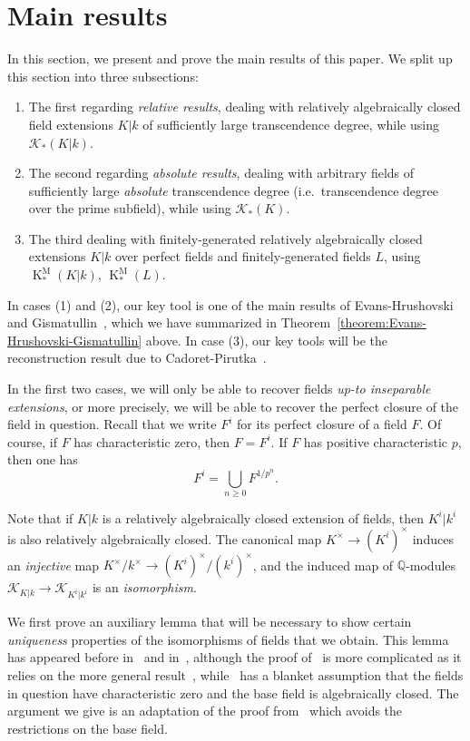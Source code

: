 \documentclass[12pt]{amsart}
\newcommand{\KM}{\operatorname{K}^\mathrm{M}}
\newcommand{\Qbb}{\mathbb{Q}}
\newcommand{\Kcal}{\mathcal{K}}
\theoremstyle{definition}
\begin{document}
\section{Main results}

In this section, we present and prove the main results of this paper.
We split up this section into three subsections:
\begin{enumerate}
  \item The first regarding \emph{relative results}, dealing with relatively algebraically closed field extensions $K|k$ of sufficiently large transcendence degree, while using $\Kcal_{*}(K|k)$.
  \item The second regarding \emph{absolute results}, dealing with arbitrary fields of sufficiently large \emph{absolute} transcendence degree (i.e.~transcendence degree over the prime subfield), while using $\Kcal_{*}(K)$.
  \item The third dealing with finitely-generated relatively algebraically closed extensions $K|k$ over perfect fields and finitely-generated fields $L$, using $\KM_{*}(K|k)$, $\KM_{*}(L)$.
\end{enumerate}
In cases (1) and (2), our key tool is one of the main results of Evans-Hrushovski and Gismatullin~\cite{zbMATH00007333,zbMATH00839199,zbMATH05350217}, which we have summarized in Theorem~\ref{theorem:Evans-Hrushovski-Gismatullin} above.
In case (3), our key tools will be the reconstruction result due to Cadoret-Pirutka~\cite[Theorem 4]{zbMATH07463742}.

In the first two cases, we will only be able to recover fields \emph{up-to inseparable extensions}, or more precisely, we will be able to recover the perfect closure of the field in question.
Recall that we write $F^{i}$ for its perfect closure of a field $F$.
Of course, if $F$ has characteristic zero, then $F = F^{i}$.
If $F$ has positive characteristic $p$, then one has
\[ F^{i} = \bigcup_{n \geq 0} F^{1/p^{n}}. \]

Note that if $K|k$ is a relatively algebraically closed extension of fields, then $K^{i}|k^{i}$ is also relatively algebraically closed.
The canonical map $K^{\times} \to (K^{i})^{\times}$ induces an \emph{injective} map $K^{\times}/k^{\times} \to (K^{i})^{\times}/(k^{i})^{\times}$, and the induced map of $\Qbb$-modules $\Kcal_{K|k} \to \Kcal_{K^{i}|k^{i}}$ is an \emph{isomorphism}.

We first prove an auxiliary lemma that will be necessary to show certain \emph{uniqueness} properties of the isomorphisms of fields that we obtain.
This lemma has appeared before in~\cite[Theorem 1.1]{zbMATH00839199} and in~\cite[Lemma 13]{zbMATH05635168}, although the proof of~\cite{zbMATH00839199} is more complicated as it relies on the more general result~\cite[Theorem 2.2.2]{zbMATH00007333}, while~\cite{zbMATH05635168} has a blanket assumption that the fields in question have characteristic zero and the base field is algebraically closed.
The argument we give is an adaptation of the proof from~\cite{zbMATH05635168} which avoids the restrictions on the base field.
\end{document}
